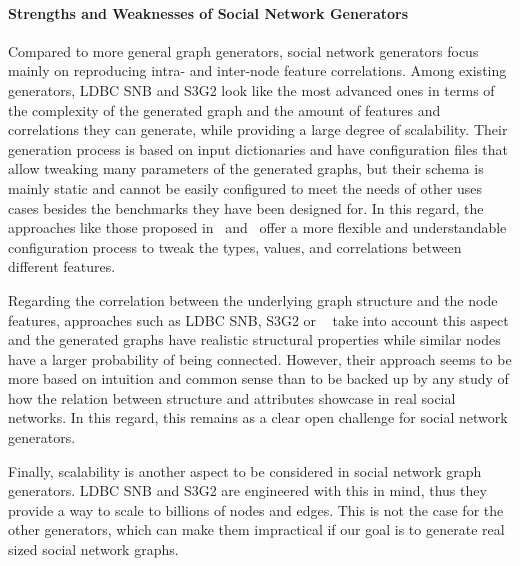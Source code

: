 \paragraph{Strengths and Weaknesses of Social Network Generators}
Compared to more general graph generators, social network generators focus
mainly on reproducing intra- and inter-node feature correlations.
Among existing generators, LDBC SNB and S3G2 look
like the most advanced ones in terms of the complexity of the generated graph
and the amount of features and correlations they can generate, while providing a
large degree of scalability. Their generation process is based on input dictionaries and have configuration files that
allow tweaking  many parameters of the generated graphs, but their schema is mainly
static and cannot be easily configured to meet the needs of other uses cases
besides the benchmarks they have been designed for. In this regard, the approaches
like those proposed in~\cite{Nettleton2016} and~\cite{Sukthankar-SocialInfo2014} offer a
more flexible and understandable configuration process to tweak the types,
values, and correlations between different features.

Regarding the correlation between the underlying graph structure and the node
features, approaches such as LDBC SNB, S3G2 or ~\cite{Nettleton2016}
take into account this aspect and the generated graphs have realistic
structural properties while similar nodes have a larger probability of being
connected. However, their approach seems to be more based on
intuition and common sense than to be backed up by  any study of how the
relation between structure and attributes showcase in real social networks. In
this regard, this remains as a clear open challenge for social network
generators.

Finally, scalability is another aspect to be considered in social network graph
generators. LDBC SNB and S3G2 are engineered with this in mind, thus they
provide a way to scale to billions of nodes and edges. This is not the case for
the other generators, which can make them impractical if our goal is to generate
real sized social network graphs.


